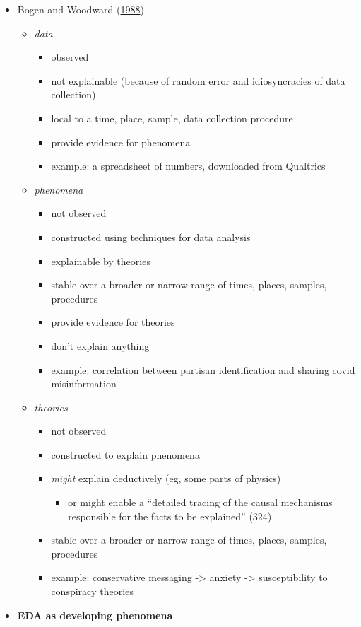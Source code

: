 \documentclass[
]{article}
\providecommand{\tightlist}{%
  \setlength{\itemsep}{0pt}\setlength{\parskip}{0pt}}
\begin{document}
\begin{itemize}
\tightlist
\item
  Bogen and Woodward (\protect\hyperlink{ref-BogenSavingPhenomena1988}{1988})

  \begin{itemize}
  \tightlist
  \item
    \emph{data}

    \begin{itemize}
    \tightlist
    \item
      observed
    \item
      not explainable (because of random error and idiosyncracies of data collection)
    \item
      local to a time, place, sample, data collection procedure
    \item
      provide evidence for phenomena
    \item
      example: a spreadsheet of numbers, downloaded from Qualtrics
    \end{itemize}
  \item
    \emph{phenomena}

    \begin{itemize}
    \tightlist
    \item
      not observed
    \item
      constructed using techniques for data analysis
    \item
      explainable by theories
    \item
      stable over a broader or narrow range of times, places, samples, procedures
    \item
      provide evidence for theories
    \item
      don't explain anything
    \item
      example: correlation between partisan identification and sharing covid misinformation
    \end{itemize}
  \item
    \emph{theories}

    \begin{itemize}
    \tightlist
    \item
      not observed
    \item
      constructed to explain phenomena
    \item
      \emph{might} explain deductively (eg, some parts of physics)

      \begin{itemize}
      \tightlist
      \item
        or might enable a ``detailed tracing of the causal mechanisms responsible for the facts to be explained'' (324)
      \end{itemize}
    \item
      stable over a broader or narrow range of times, places, samples, procedures
    \item
      example: conservative messaging -\textgreater{} anxiety -\textgreater{} susceptibility to conspiracy theories
    \end{itemize}
  \end{itemize}
\item
  \textbf{EDA as developing phenomena}


\end{itemize}
\end{document}
